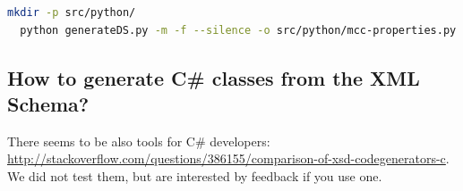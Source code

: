 \documentclass[10pt,english,a4paper]{article}
\begin{document}
\begin{lstlisting}[language=sh]
  mkdir -p src/python/
  python generateDS.py -m -f --silence -o src/python/mcc-properties.py mcc-properties.xsd
\end{lstlisting}

\subsection{How to generate C\# classes from the XML Schema?}
There seems to be also tools for C\# developers: \\
\url{http://stackoverflow.com/questions/386155/comparison-of-xsd-codegenerators-c}.
We did not test them, but are interested by feedback if you use one.
\end{document}
